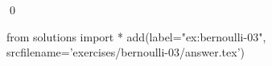 
\begin{ex} 
  \label{ex:bernoulli-03}
  
  \qed
\end{ex} 
\begin{python0}
from solutions import *
add(label="ex:bernoulli-03",
    srcfilename='exercises/bernoulli-03/answer.tex') 
\end{python0}
